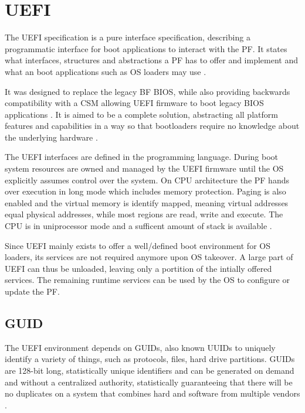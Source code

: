 
\section{\acf{UEFI}}

The \ac{UEFI} specification is a pure interface specification, describing a programmatic interface for boot applications to interact with the \ac{PF}.
It states what interfaces, structures and abstractions a \ac{PF} has to offer and implement and what an boot applications such as \ac{OS} loaders may use \cite{beyond-bios}.

It was designed to replace the legacy \acl{BF} \ac{BIOS}, while also providing backwards compatibility with a \acf{CSM} allowing \ac{UEFI} firmware to boot legacy \ac{BIOS} applications \cite{beyond-bios}.
It is aimed to be a complete solution, abstracting all platform features and capabilities in a way so that bootloaders require no knowledge about the underlying hardware \cite[1.3]{uefi-spec}.

The \ac{UEFI} interfaces are defined in the  programming language.
During boot system resources are owned and managed by the \ac{UEFI} firmware until the \ac{OS} explicitly assumes control over the system.
On  \ac{CPU} architecture the \ac{PF} hands over execution in  long mode which includes memory protection.
Paging is also enabled and the virtual memory is identify mapped, meaning virtual addresses equal physical addresses, while most regions are read, write and execute.
The \ac{CPU} is in uniprocessor mode and a sufficent amount of stack is available \cite[Section 2.3.4]{uefi-spec}.

Since \ac{UEFI} mainly exists to offer a well\-/defined boot environment for \ac{OS} loaders, its services are not required anymore upon \ac{OS} takeover.
A large part of \ac{UEFI} can thus be unloaded, leaving only a portition of the intially offered services.
The remaining runtime services can be used by the \ac{OS} to configure or update the \ac{PF}.

\subsection{\acf{GUID}}

The \ac{UEFI} environment depends on \acp{GUID}, also known \acp{UUID} to uniquely identify a variety of things, such as protocols, files, hard drive partitions.
\acp{GUID} are 128-bit long, statistically unique identifiers and can be generated on demand and without a centralized authority, statistically guaranteeing that there will be no duplicates on a system that combines hard and software from multiple vendors \cite{rfc-4122}.

